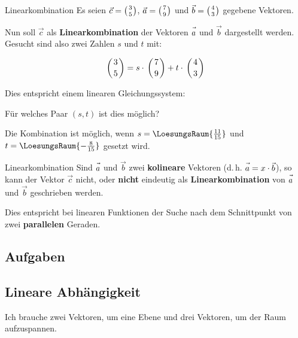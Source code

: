 \begin{beispiel}{Linearkombination}{}
  Es seien $\vec{c} = \left(3 \atop 5\right)$, $\vec{a} = \left(7 \atop
  9\right)$ und $\vec{b} = \left(4 \atop 3\right)$ gegebene Vektoren.

  Nun soll $\vec{c}$ als \textbf{Linearkombination} der Vektoren
  $\vec{a\vphantom{b}}$ und $\vec{b}$ dargestellt werden. Gesucht sind also zwei
  Zahlen $s$ und $t$ mit:

  $$\left(3 \atop 5\right) = s\cdot{} \left(7 \atop 9\right) +
  t\cdot{} \left(4 \atop 3\right)$$

  Dies entspricht einem linearen Gleichungssystem:

  Für welches Paar $(s, t)$ ist dies möglich?
  
  
  Die Kombination ist möglich, wenn $s=\LoesungsRaum{\frac{11}{15}}$ und\\
  $t=\LoesungsRaum{-\frac{8}{15}}$ gesetzt wird.
\end{beispiel}

\begin{bemerkung}{Linearkombination}{}
  Sind $\vec{a\vphantom{b}}$ und $\vec{b}$ zwei \textbf{kolineare} Vektoren
  (d.\,h. $\vec{a\vphantom{b}} = x\cdot{}\vec{b}$), so kann der Vektor $\vec{c}$
  nicht, oder \textbf{nicht} eindeutig als \textbf{Linearkombination} von $\vec{a\vphantom{b}}$ und
  $\vec{b}$ geschrieben werden.

  Dies entspricht bei linearen Funktionen der Suche nach dem
  Schnittpunkt von zwei \textbf{parallelen} Geraden.
  \end{bemerkung}


\subsection*{Aufgaben}

\newpage
\subsection{Lineare Abhängigkeit}

Ich brauche zwei Vektoren, um eine Ebene und drei Vektoren, um der
Raum aufzuspannen.



